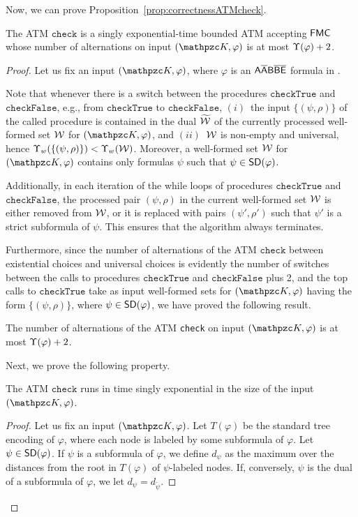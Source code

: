 Now, we can prove Proposition~\ref{prop:correctnessATMcheck}.
\begin{proposition*}[\ref{prop:correctnessATMcheck}] The ATM  $\texttt{check}$ is a singly exponential-time bounded ATM accepting $\mathsf{FMC}$ whose number of alternations on input $(\Ku,\varphi)$ is at most $\Upsilon(\varphi)+2$.
\end{proposition*}
\begin{proof}
Let us fix an input $(\Ku,\varphi)$, where $\varphi$
is an $\mathsf{A\overline{A}B\overline{B}\overline{E}}$ formula in \nnf. 

Note that whenever there is a switch between the procedures $\texttt{checkTrue}$ and $\texttt{checkFalse}$, e.g., from $\texttt{checkTrue}$ to $\texttt{checkFalse}$, $(i)$~the input $\{(\psi,\rho)\}$ of the called procedure is contained in the dual $\widetilde{{\mathcal{W}}}$ of the currently processed well-formed set ${\mathcal{W}}$ for $(\Ku,\varphi)$, and $(ii)$~${\mathcal{W}}$ is non-empty and universal, hence $\Upsilon_w(\{(\psi,\rho)\})< \Upsilon_w({\mathcal{W}})$. Moreover, a well-formed set ${\mathcal{W}}$ for $(\Ku,\varphi)$ contains only formulas $\psi$ such that $\psi\in \textsf{SD}(\varphi)$.

Additionally, in each iteration of the while loops of procedures $\texttt{checkTrue}$ and $\texttt{checkFalse}$, the processed pair $(\psi,\rho)$ in the current well-formed set ${\mathcal{W}}$ is either removed from ${\mathcal{W}}$, or it is replaced with pairs $(\psi',\rho')$ such that $\psi'$ is a strict subformula of $\psi$.
 This ensures that the algorithm always terminates. 
 
Furthermore, since the number of alternations of the ATM $\texttt{check}$  between existential choices and universal choices is evidently the number of switches between the calls to procedures $\texttt{checkTrue}$ and $\texttt{checkFalse}$ plus 2, and the top calls to $\texttt{checkTrue}$ take as input well-formed sets for $(\Ku,\varphi)$ having the form  $\{(\psi,\rho)\}$, where $\psi\in\textsf{SD}(\varphi)$, we have proved the following result.

\begin{claim}
The number of alternations of the ATM \texttt{check} on input $(\Ku,\varphi)$ is at most $\Upsilon(\varphi)+2$.
\end{claim} 

Next, we prove the following property.
\begin{claim}\label{claim:sinExp}
The ATM $\texttt{check}$ runs in time singly exponential in the size of the input $(\Ku,\varphi)$.
\end{claim}
\begin{proof}
Let us fix an input $(\Ku,\varphi)$.  Let $T(\varphi)$ be the standard tree encoding of $\varphi$, where each node is labeled by some subformula of $\varphi$.
Let $\psi\in\textsf{SD}(\varphi)$. If $\psi$ is a subformula of $\varphi$, we define $d_\psi$ as the maximum over the distances from the root in $T(\varphi)$ of $\psi$-labeled nodes. If, conversely, $\psi$ is the dual of a subformula of $\varphi$, we let
 $d_\psi = d_{\widetilde{\psi}}$. 
 

\end{proof}
\end{proof}
